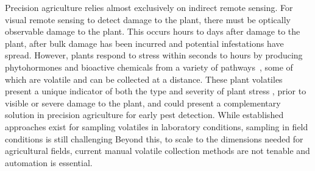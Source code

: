Precision agriculture relies almost exclusively on indirect remote sensing.
For visual remote sensing to detect damage to the plant, there must be optically observable damage to the plant. This occurs hours to days after damage to the plant, after bulk damage has been incurred and potential infestations have spread. However, plants respond to stress within seconds to hours by producing phytohormones and bioactive chemicals from a variety of pathways~\cite{schuman_layers_2016}, some of which are volatile and can be collected at a distance. These plant volatiles present a unique indicator of both the type and severity of plant stress \cite{howe_plant_2008, dicke_evolutionary_2010}, prior to visible or severe damage to the plant, and could present a complementary solution in precision agriculture for early pest detection. While established approaches exist for sampling volatiles in laboratory conditions, sampling in field conditions is still challenging \cite{} %
Beyond this, to scale to the dimensions needed for agricultural fields, current manual volatile collection methods are not tenable and automation is essential. 


